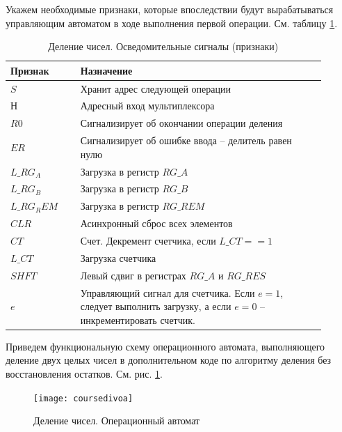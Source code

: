\documentclass[a4paper,14pt]{extarticle}
\begin{document}
Укажем необходимые признаки, которые впоследствии будут вырабатываться управляющим автоматом в ходе выполнения первой операции. См. таблицу \ref{tab:signalsop1}.
\begin{table}[h!]
	\small
	\centering
	\begin{tabular}{|m{0.2\linewidth}|m{0.7\linewidth}|}
		\hline
		\textbf{Признак} & \textbf{Назначение} \\ \hline
		$S$ & Хранит адрес следующей операции \\ \hline
		$Н$ & Адресный вход мультиплексора \\ \hline
		$R0$ & Сигнализирует об окончании операции деления \\ \hline
		$ER$ & Сигнализирует об ошибке ввода -- делитель равен нулю \\ \hline
		$L\_RG_A$ & Загрузка в регистр $RG\_A$ \\ \hline
		$L\_RG_B$ & Загрузка в регистр $RG\_B$ \\ \hline
		$L\_RG_REM$ & Загрузка в регистр $RG\_REM$ \\ \hline
		$CLR$ & Асинхронный сброс всех элементов \\ \hline
		$CT$ & Счет. Декремент счетчика, если $L\_CT==1$ \\ \hline
		$L\_CT$ & Загрузка счетчика \\ \hline
		$SHFT$ & Левый сдвиг в регистрах $RG\_A \text{ и } RG\_RES$ \\ \hline
		$e$ & Управляющий сигнал для счетчика. Если $e=1$, следует выполнить загрузку, а если $e=0$ -- инкрементировать счетчик. \\ \hline
	\end{tabular}
	\caption{Деление чисел. Осведомительные сигналы (признаки)}
	\label{tab:signalsop1}
\end{table}



Приведем функциональную схему операционного автомата, выполняющего деление двух целых чисел в дополнительном коде по алгоритму деления без восстановления остатков. См. рис. \ref{fig:courseoperationautomat}.

\begin{figure}[htbp]
	\centering
	\texttt{[image: coursedivoa]}
	\caption{Деление чисел. Операционный автомат}
	\label{fig:courseoperationautomat}
\end{figure}


\vspace{10ex}
\newpage
\end{document}
